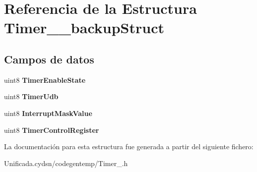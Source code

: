 \hypertarget{struct_timer__1__backup_struct}{}\section{Referencia de la Estructura Timer\+\_\+\_\+backup\+Struct}
\label{struct_timer__1__backup_struct}
\subsection*{Campos de datos}
\begin{DoxyCompactItemize}
\item 
\mbox{\label{struct_timer__1__backup_struct_a02d7a5264610dd17ede2bf5d1a8274cf}} 
uint8 {\bfseries Timer\+Enable\+State}
\item 
\mbox{\label{struct_timer__1__backup_struct_a30219438feaa9b90e8b9ffed577452ec}} 
uint8 {\bfseries Timer\+Udb}
\item 
\mbox{\label{struct_timer__1__backup_struct_a0eb909e8b6356ae6094cb5297e54e71a}} 
uint8 {\bfseries Interrupt\+Mask\+Value}
\item 
\mbox{\label{struct_timer__1__backup_struct_adbbbbbf743ffcd2219f83c6b37df7a11}} 
uint8 {\bfseries Timer\+Control\+Register}
\end{DoxyCompactItemize}


La documentación para esta estructura fue generada a partir del siguiente fichero\+:\begin{DoxyCompactItemize}
\item 
Unificada.\+cydsn/codegentemp/Timer\+\_.\+h\end{DoxyCompactItemize}
